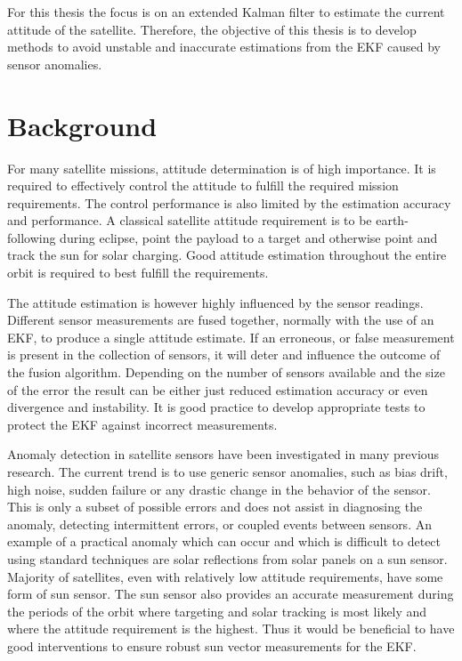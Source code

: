 For this thesis the focus is on an extended Kalman filter to estimate the current attitude of the satellite. Therefore, the objective of this thesis is to develop methods to avoid unstable and inaccurate estimations from the EKF caused by sensor anomalies.

\section{Background}
For many satellite missions, attitude determination is of high importance. It is required to effectively control the attitude to fulfill the required mission requirements.  The control performance is also limited by the estimation accuracy and performance.  A classical satellite attitude requirement is to be earth-following during eclipse, point the payload to a target and otherwise point and track the sun for solar charging. Good attitude estimation throughout the entire orbit is required to best fulfill the requirements.

The attitude estimation is however highly influenced by the sensor readings. Different sensor measurements are fused together, normally with the use of an EKF, to produce a single attitude estimate.  If an erroneous, or false measurement is present in the collection of sensors, it will deter and influence the outcome of the fusion algorithm.  Depending on the number of sensors available and the size of the error the result can be either just reduced estimation accuracy or even divergence and instability. It is good practice to develop appropriate tests to protect the EKF against incorrect measurements. 

Anomaly detection in satellite sensors have been investigated in many previous research.  The current trend is to use generic sensor anomalies, such as bias drift, high noise, sudden failure or any drastic change in the behavior of the sensor. This is only a subset of possible errors and does not assist in diagnosing the anomaly, detecting intermittent errors, or coupled events between sensors. An example of a practical anomaly which can occur and which is difficult to detect using standard techniques are solar reflections from solar panels on a sun sensor. Majority of satellites, even with relatively low attitude requirements, have some form of sun sensor.  The sun sensor also provides an accurate measurement during the periods of the orbit where targeting and solar tracking is most likely and where the attitude requirement is the highest.  Thus it would be beneficial to have good interventions to ensure robust sun vector measurements for the EKF.

